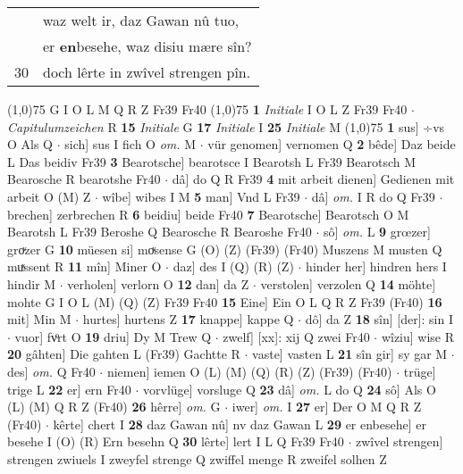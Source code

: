 \documentclass[8pt,a4paper,notitlepage]{article}
\begin{document}
\begin{table}[ht]
\begin{minipage}[t]{0.5\linewidth}
\begin{tabular}{rl}
 & waz welt ir, daz Gawan nû tuo,\\ 
 & er \textbf{en}besehe, waz disiu mære sîn?\\ 
30 & doch lêrte in zwîvel strengen pîn.\\ 
\end{tabular}
\scriptsize
\line(1,0){75} \newline
G I O L M Q R Z Fr39 Fr40 \newline
\line(1,0){75} \newline
\textbf{1} \textit{Initiale} I O L Z Fr39 Fr40   $\cdot$ \textit{Capitulumzeichen} R  \textbf{15} \textit{Initiale} G  \textbf{17} \textit{Initiale} I  \textbf{25} \textit{Initiale} M  \newline
\line(1,0){75} \newline
\textbf{1} sus] ÷vs O Als Q  $\cdot$ sich] sus I fich O \textit{om.} M  $\cdot$ vür genomen] vernomen Q \textbf{2} bêde] Daz beide L Das beidiv Fr39 \textbf{3} Bearotsche] bearotsce I Bearotsh L Fr39 Bearotsch M Bearosche R bearotshe Fr40  $\cdot$ dâ] do Q R Fr39 \textbf{4} mit arbeit dienen] Gedienen mit arbeit O (M) Z  $\cdot$ wîbe] wibes I M \textbf{5} man] Vnd L Fr39  $\cdot$ dâ] \textit{om.} I R do Q Fr39  $\cdot$ brechen] zerbrechen R \textbf{6} beidiu] beide Fr40 \textbf{7} Bearotsche] Bearotsch O M Bearotsh L Fr39 Beroshe Q Bearosche R Bearoshe Fr40  $\cdot$ sô] \textit{om.} L \textbf{9} grœzer] groͮzer G \textbf{10} müesen si] moͮsense G (O) (Z) (Fr39) (Fr40) Muszens M musten Q muͯssent R \textbf{11} mîn] Miner O  $\cdot$ daz] des I (Q) (R) (Z)  $\cdot$ hinder her] hindren hers I hindir M  $\cdot$ verholen] verlorn O \textbf{12} dan] da Z  $\cdot$ verstolen] verzolen Q \textbf{14} möhte] mohte G I O L (M) (Q) (Z) Fr39 Fr40 \textbf{15} Eine] Ein O L Q R Z Fr39 (Fr40) \textbf{16} mit] Min M  $\cdot$ hurtes] hurtens Z \textbf{17} knappe] kappe Q  $\cdot$ dô] da Z \textbf{18} sîn] [der]: sin I  $\cdot$ vuor] fvͦrt O \textbf{19} driu] Dy M Trew Q  $\cdot$ zwelf] [xx]: xij Q zwei Fr40  $\cdot$ wîziu] wise R \textbf{20} gâhten] Die gahten L (Fr39) Gachtte R  $\cdot$ vaste] vasten L \textbf{21} sîn gir] sy gar M  $\cdot$ des] \textit{om.} Q Fr40  $\cdot$ niemen] iemen O (L) (M) (Q) (R) (Z) (Fr39) (Fr40)  $\cdot$ trüge] trige L \textbf{22} er] ern Fr40  $\cdot$ vorvlüge] vorsluge Q \textbf{23} dâ] \textit{om.} L do Q \textbf{24} sô] Als O (L) (M) Q R Z (Fr40) \textbf{26} hêrre] \textit{om.} G  $\cdot$ iwer] \textit{om.} I \textbf{27} er] Der O M Q R Z (Fr40)  $\cdot$ kêrte] chert I \textbf{28} daz Gawan nû] nv daz Gawan L \textbf{29} er enbesehe] er besehe I (O) (R) Ern besehn Q \textbf{30} lêrte] lert I L Q Fr39 Fr40  $\cdot$ zwîvel strengen] strengen zwiuels I zweyfel strenge Q zwiffel menge R zweifel solhen Z \newline

\end{minipage}
\end{table}
\end{document}

